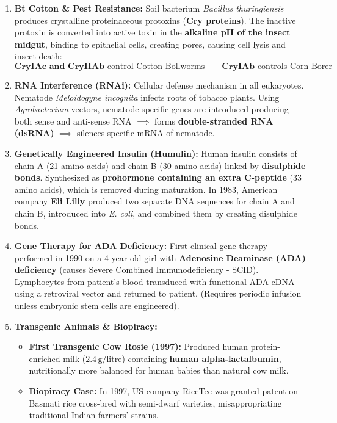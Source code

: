 \documentclass[10pt,a4paper]{article}
\begin{document}
\begin{ncertbox}
\begin{enumerate}[leftmargin=*]
  \item \textbf{Bt Cotton \& Pest Resistance:}
  Soil bacterium \textit{Bacillus thuringiensis} produces crystalline proteinaceous protoxins (\textbf{Cry proteins}). The inactive protoxin is converted into active toxin in the \textbf{alkaline pH of the insect midgut}, binding to epithelial cells, creating pores, causing cell lysis and insect death:
  \begin{equation}
    \mathbf{CryIAc \text{ and } CryIIAb} \text{ control Cotton Bollworms} \qquad \mathbf{CryIAb} \text{ controls Corn Borer}
  \end{equation}
  \item \textbf{RNA Interference (RNAi):}
  Cellular defense mechanism in all eukaryotes. Nematode \textit{Meloidogyne incognita} infects roots of tobacco plants. Using \textit{Agrobacterium} vectors, nematode-specific genes are introduced producing both sense and anti-sense RNA $\implies$ forms \textbf{double-stranded RNA (dsRNA)} $\implies$ silences specific mRNA of nematode.
  \item \textbf{Genetically Engineered Insulin (Humulin):}
  Human insulin consists of chain A (21 amino acids) and chain B (30 amino acids) linked by \textbf{disulphide bonds}. Synthesized as \textbf{prohormone containing an extra C-peptide} (33 amino acids), which is removed during maturation. In 1983, American company \textbf{Eli Lilly} produced two separate DNA sequences for chain A and chain B, introduced into \textit{E. coli}, and combined them by creating disulphide bonds.
  \item \textbf{Gene Therapy for ADA Deficiency:}
  First clinical gene therapy performed in 1990 on a 4-year-old girl with \textbf{Adenosine Deaminase (ADA) deficiency} (causes Severe Combined Immunodeficiency - SCID). Lymphocytes from patient's blood transduced with functional ADA cDNA using a retroviral vector and returned to patient. (Requires periodic infusion unless embryonic stem cells are engineered).
  \item \textbf{Transgenic Animals \& Biopiracy:}
  \begin{itemize}
    \item \textbf{First Transgenic Cow Rosie (1997):} Produced human protein-enriched milk ($2.4\,\mathrm{g/litre}$) containing \textbf{human alpha-lactalbumin}, nutritionally more balanced for human babies than natural cow milk.
    \item \textbf{Biopiracy Case:} In 1997, US company RiceTec was granted patent on Basmati rice cross-bred with semi-dwarf varieties, misappropriating traditional Indian farmers' strains.
  \end{itemize}
\end{enumerate}
\end{ncertbox}
\end{document}
